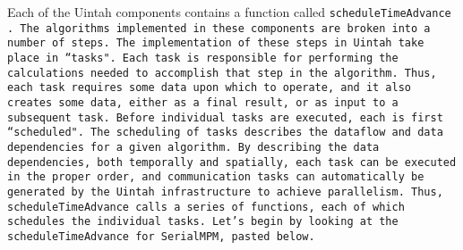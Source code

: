 Each of the Uintah components contains a function called  \tt scheduleTimeAdvance \normalfont.
The algorithms implemented in these components are broken into a number
of steps.  The implementation of these steps in Uintah take place in ``tasks".
Each task is responsible for performing the calculations needed to accomplish
that step in the algorithm.  Thus, each task requires some data upon which
to operate, and it also creates some data, either as a final result, or as
input to a subsequent task.  Before individual tasks are executed, each is
first ``scheduled".  The scheduling of tasks describes the dataflow and data
dependencies for a given algorithm.  By describing the data dependencies,
both temporally and spatially, each task can be executed in the proper order,
and communication tasks can automatically be generated by the Uintah
infrastructure to achieve parallelism.  Thus, scheduleTimeAdvance calls
a series of functions, each of which schedules the individual tasks.  Let's
begin by looking at the \tt scheduleTimeAdvance \normalfont for \tt SerialMPM, \normalfont pasted below.

